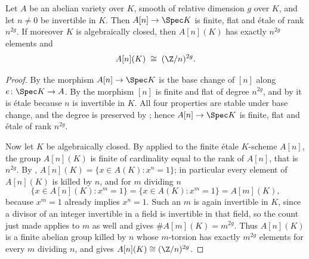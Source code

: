 \begin{proposition}
\label{prop:av-etale-torsion}
\leanok
Let $A$ be an abelian variety over $K$, smooth of relative dimension $g$ over
$K$, and let $n\neq0$ be invertible in $K$.  Then $A[n]\to\Spec K$ is finite,
flat and \'etale of rank $n^{2g}$.  If moreover $K$ is algebraically closed,
then $A[n](K)$ has exactly $n^{2g}$ elements and
\[
  A[n](K)\;\cong\;(\Z/n)^{2g}.
\]
\end{proposition}
\begin{proof}
\leanok
By  the morphism $A[n]\to\Spec K$ is the base
change of $[n]$ along $e\colon\Spec K\to A$.  By  the
morphism $[n]$ is finite and flat of degree $n^{2g}$, and by
 it is \'etale because $n$ is invertible in $K$.  All
four properties are stable under base change, and the degree is preserved by
; hence $A[n]\to\Spec K$ is finite, flat and
\'etale of rank $n^{2g}$.

Now let $K$ be algebraically closed.  By 
applied to the finite \'etale $K$-scheme $A[n]$, the group $A[n](K)$ is finite
of cardinality equal to the rank of $A[n]$, that is $n^{2g}$.  By
, $A[n](K)=\{x\in A(K):x^n=1\}$; in particular
every element of $A[n](K)$ is killed by $n$, and for $m$ dividing $n$
\[
  \{x\in A[n](K):x^m=1\}=\{x\in A(K):x^m=1\}=A[m](K),
\]
because $x^m=1$ already implies $x^n=1$.  Such an $m$ is again invertible in
$K$, since a divisor of an integer invertible in a field is invertible in that
field, so the count just made applies to $m$ as well and gives
$\#A[m](K)=m^{2g}$.  Thus $A[n](K)$ is a finite abelian group killed by $n$
whose $m$-torsion has exactly $m^{2g}$ elements for every $m$ dividing $n$, and
 gives $A[n](K)\cong(\Z/n)^{2g}$.
\end{proof}

